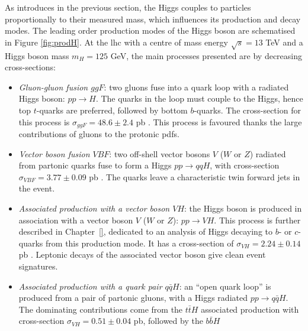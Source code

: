 As introduces in the previous section, the Higgs couples to particles proportionally to their measured mass, which influences its production and decay modes. The leading order production modes of the Higgs boson are schematised in Figure \ref{fig:prodH}. At the \gls{lhc} with a centre of mass energy $\sqrt{s} = 13$ TeV and a Higgs boson mass $m_H = 125$ GeV, the main processes presented are by decreasing cross-sections: 
\begin{itemize} %
    \item \textit{Gluon-gluon fusion $ggF$}: two gluons fuse into a quark loop with a radiated Higgs boson: $pp \rightarrow H$. The quarks in the loop must couple to the Higgs, hence top $t$-quarks are preferred, followed by bottom $b$-quarks. The cross-section for this process is $\sigma_{ggF} = 48.6 \pm 2.4$ pb \cite{LHCHiggsCrossSectionWorkingGroup:2016ypw}. This process is favoured thanks the large contributions of gluons to the protonic \gls{pdf}s.
    \item \textit{Vector boson fusion $VBF$}: two off-shell vector bosons $V$ ($W$ or $Z$) radiated from partonic quarks fuse to form a Higgs $pp \rightarrow qqH$, with cross-section $\sigma_{VBF} = 3.77 \pm 0.09$ pb \cite{LHCHiggsCrossSectionWorkingGroup:2016ypw}. The quarks leave a characteristic twin forward jets in the event.
    \item \textit{Associated production with a vector boson $VH$}: the Higgs boson is produced in association with a vector boson $V$ ($W$ or $Z$): $pp \rightarrow VH$. This process is further described in Chapter~\ref{}, dedicated to an analysis of Higgs decaying to $b$- or $c$-quarks from this production mode. It has a cross-section of $\sigma_{VH} = 2.24 \pm 0.14$ pb \cite{LHCHiggsCrossSectionWorkingGroup:2016ypw}. Leptonic decays of the associated vector boson give clean event signatures.
    \item \textit{Associated production with a quark pair $q\bar{q}H$}: an ``open quark loop'' is produced from a pair of partonic gluons, with a Higgs radiated $pp \rightarrow q\bar{q}H$. The dominating contributions come from the $t\bar{t}H$ associated production with cross-section $\sigma_{VH} = 0.51 \pm 0.04$ pb, followed by the $b\bar{b}H$ \cite{LHCHiggsCrossSectionWorkingGroup:2016ypw}
\end{itemize}

